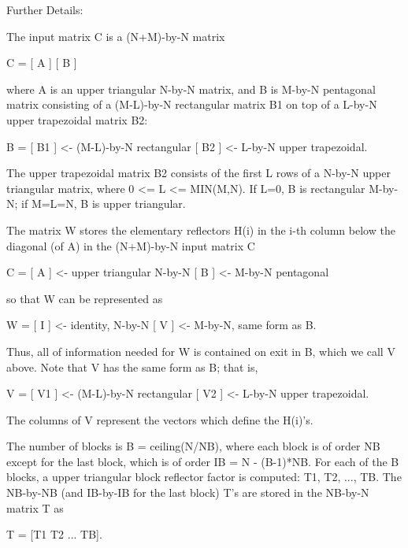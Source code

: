 \begin{DoxyParagraph}{Further Details\+: }
\begin{DoxyVerb}  The input matrix C is a (N+M)-by-N matrix  

               C = [ A ]
                   [ B ]        

  where A is an upper triangular N-by-N matrix, and B is M-by-N pentagonal
  matrix consisting of a (M-L)-by-N rectangular matrix B1 on top of a L-by-N
  upper trapezoidal matrix B2:

               B = [ B1 ]  <- (M-L)-by-N rectangular
                   [ B2 ]  <-     L-by-N upper trapezoidal.

  The upper trapezoidal matrix B2 consists of the first L rows of a
  N-by-N upper triangular matrix, where 0 <= L <= MIN(M,N).  If L=0, 
  B is rectangular M-by-N; if M=L=N, B is upper triangular.  

  The matrix W stores the elementary reflectors H(i) in the i-th column
  below the diagonal (of A) in the (N+M)-by-N input matrix C

               C = [ A ]  <- upper triangular N-by-N
                   [ B ]  <- M-by-N pentagonal

  so that W can be represented as

               W = [ I ]  <- identity, N-by-N
                   [ V ]  <- M-by-N, same form as B.

  Thus, all of information needed for W is contained on exit in B, which
  we call V above.  Note that V has the same form as B; that is, 

               V = [ V1 ] <- (M-L)-by-N rectangular
                   [ V2 ] <-     L-by-N upper trapezoidal.

  The columns of V represent the vectors which define the H(i)'s.  

  The number of blocks is B = ceiling(N/NB), where each
  block is of order NB except for the last block, which is of order 
  IB = N - (B-1)*NB.  For each of the B blocks, a upper triangular block
  reflector factor is computed: T1, T2, ..., TB.  The NB-by-NB (and IB-by-IB 
  for the last block) T's are stored in the NB-by-N matrix T as

               T = [T1 T2 ... TB].\end{DoxyVerb}
 
\end{DoxyParagraph}
